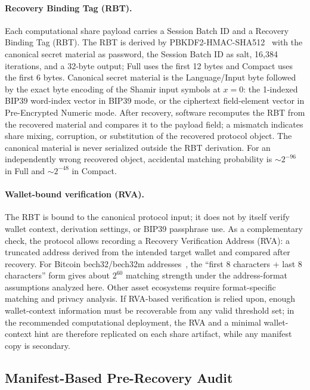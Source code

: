 \documentclass[11pt]{article}
\begin{document}
\paragraph{Recovery Binding Tag (RBT).}
\label{sec:identity-lock}
Each computational share payload carries a Session Batch ID and a Recovery Binding Tag (RBT). The RBT is derived by PBKDF2-HMAC-SHA512~\cite{rfc2104} with the canonical secret material as password, the Session Batch ID as salt, 16,384 iterations, and a 32-byte output; Full uses the first 12 bytes and Compact uses the first 6 bytes. Canonical secret material is the Language/Input byte followed by the exact byte encoding of the Shamir input symbols at $x=0$: the 1-indexed BIP39 word-index vector in BIP39 mode, or the ciphertext field-element vector in Pre-Encrypted Numeric mode. After recovery, software recomputes the RBT from the recovered material and compares it to the payload field; a mismatch indicates share mixing, corruption, or substitution of the recovered protocol object. The canonical material is never serialized outside the RBT derivation. For an independently wrong recovered object, accidental matching probability is ${\sim}2^{-96}$ in Full and ${\sim}2^{-48}$ in Compact.

\paragraph{Wallet-bound verification (RVA).}
\label{sec:rva}
The RBT is bound to the canonical protocol input; it does not by itself verify wallet context, derivation settings, or BIP39 passphrase use. As a complementary check, the protocol allows recording a Recovery Verification Address (RVA): a truncated address derived from the intended target wallet and compared after recovery. For Bitcoin bech32/bech32m addresses~\cite{bip173,bip350}, the ``first 8 characters + last 8 characters'' form gives about $2^{60}$ matching strength under the address-format assumptions analyzed here. Other asset ecosystems require format-specific matching and privacy analysis. If RVA-based verification is relied upon, enough wallet-context information must be recoverable from any valid threshold set; in the recommended computational deployment, the RVA and a minimal wallet-context hint are therefore replicated on each share artifact, while any manifest copy is secondary.

\subsection{Manifest-Based Pre-Recovery Audit}
\label{sec:audit-drill}
\end{document}
